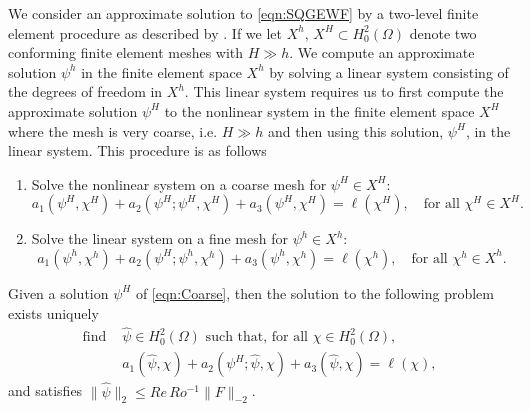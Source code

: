 We consider an approximate solution to \eqref{eqn:SQGEWF} by a two-level finite
element procedure as described by \cite{Fairag98,Layton93}. If we let $X^h,\,
X^H \subset H^2_0(\Omega)$ denote two conforming finite element meshes with $H
\gg h$. We compute an approximate solution $\psi^h$ in the finite element space
$X^h$ by solving a linear system consisting of the degrees of freedom in $X^h$.
This linear system requires us to first compute the approximate solution
$\psi^H$ to the nonlinear system in the finite element space $X^H$ where the
mesh is very coarse, i.e. $H \gg h$ and then using this solution, $\psi^H$, in
the linear system. This procedure is as follows

\begin{algorithm}%
  \caption{}%
  \label{alg:TwoLevel}
  \begin{enumerate}[Step 1:]
    \item Solve the nonlinear system on a coarse mesh for $\psi^H\in X^H$:
    \begin{equation}
      a_1(\psi^H,\chi^H) + a_2(\psi^H; \psi^H,\chi^H) + a_3(\psi^H,\chi^H) = \ell(\chi^H), \quad \text{for all }
        \chi^H \in X^H.
      \label{eqn:Coarse}
    \end{equation}
    \item Solve the linear system on a fine mesh for $\psi^h\in X^h$:
    \begin{equation}
      a_1(\psi^h,\chi^h) + a_2(\psi^H; \psi^h,\chi^h) + a_3(\psi^h,\chi^h) = \ell(\chi^h), \quad \text{for all }
        \chi^h \in X^h.
      \label{eqn:Fine}
    \end{equation}
  \end{enumerate}
\end{algorithm}
\begin{lemma}\label{lma:Fine}
  Given a solution $\psi^H$ of \eqref{eqn:Coarse}, then the solution to the
  following problem exists uniquely
    \begin{equation}
      \begin{split}
        \text{find } &\hat{\psi} \in H^2_0(\Omega) \text{ such that, for all } \chi\in H^2_0(\Omega), \\
        &a_1(\hat{\psi}, \chi) + a_2(\psi^H; \hat{\psi}, \chi) + a_3(\hat{\psi},\chi) = \ell(\chi),
      \end{split}
      \label{eqn:FineProb}
    \end{equation}
    and satisfies $\|\hat{\psi}\|_2 \le Re\, Ro^{-1} \|F\|_{-2}$.
\end{lemma}
